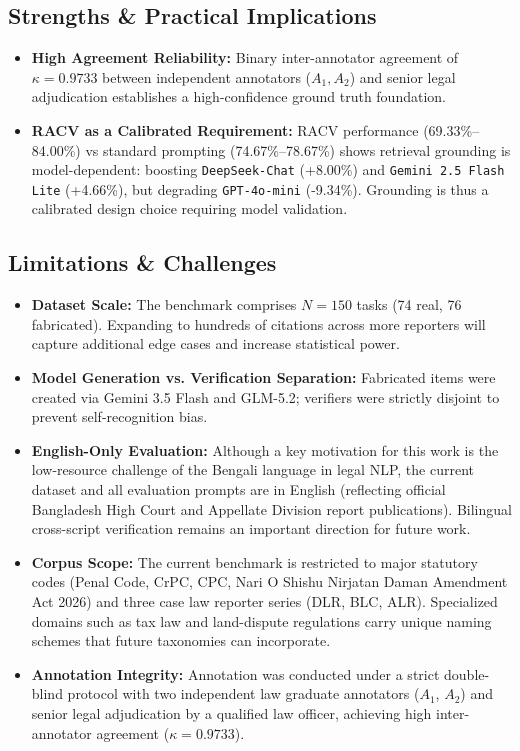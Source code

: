 \documentclass[conference]{IEEEtran}
\begin{document}
\subsection{Strengths \& Practical Implications}
\begin{itemize}
\item \textbf{High Agreement Reliability:} Binary inter-annotator agreement of $\kappa = 0.9733$ between independent annotators ($A_1, A_2$) and senior legal adjudication establishes a high-confidence ground truth foundation.
\item \textbf{RACV as a Calibrated Requirement:} RACV performance (69.33\%--84.00\%) vs standard prompting (74.67\%--78.67\%) shows retrieval grounding is model-dependent: boosting \texttt{DeepSeek-Chat} (+8.00\%) and \texttt{Gemini 2.5 Flash Lite} (+4.66\%), but degrading \texttt{GPT-4o-mini} (-9.34\%). Grounding is thus a calibrated design choice requiring model validation.
\end{itemize}

\subsection{Limitations \& Challenges}
\begin{itemize}
\item \textbf{Dataset Scale:} The benchmark comprises $N = 150$ tasks (74 real, 76 fabricated). Expanding to hundreds of citations across more reporters will capture additional edge cases and increase statistical power.
\item \textbf{Model Generation vs. Verification Separation:} Fabricated items were created via Gemini 3.5 Flash and GLM-5.2; verifiers were strictly disjoint to prevent self-recognition bias.
\item \textbf{English-Only Evaluation:} Although a key motivation for this work is the low-resource challenge of the Bengali language in legal NLP, the current dataset and all evaluation prompts are in English (reflecting official Bangladesh High Court and Appellate Division report publications). Bilingual cross-script verification remains an important direction for future work.
\item \textbf{Corpus Scope:} The current benchmark is restricted to major statutory codes (Penal Code, CrPC, CPC, Nari O Shishu Nirjatan Daman Amendment Act 2026) and three case law reporter series (DLR, BLC, ALR). Specialized domains such as tax law and land-dispute regulations carry unique naming schemes that future taxonomies can incorporate.
\item \textbf{Annotation Integrity:} Annotation was conducted under a strict double-blind protocol with two independent law graduate annotators ($A_1$, $A_2$) and senior legal adjudication by a qualified law officer, achieving high inter-annotator agreement ($\kappa = 0.9733$).
\end{itemize}
\end{document}
